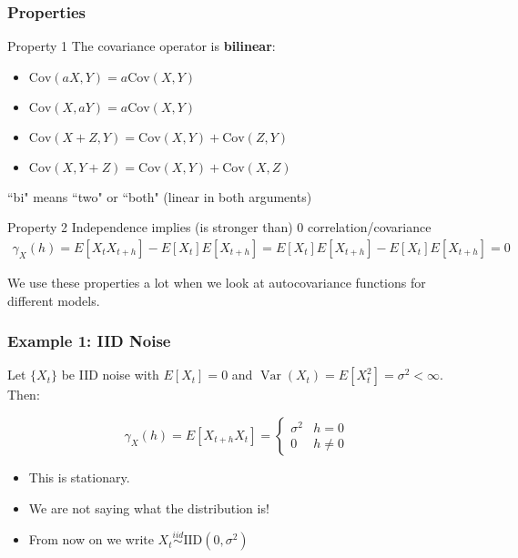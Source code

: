 \documentclass{beamer}
\begin{document}
\begin{frame}
\frametitle{Properties}

\begin{block}{Property 1}
The covariance operator is {\bf bilinear}: 
\begin{itemize}
\item $\text{Cov}(aX,Y) = a\text{Cov}(X,Y)$
\item $\text{Cov}(X,aY) = a\text{Cov}(X,Y)$
\item $\text{Cov}(X+Z,Y) = \text{Cov}(X,Y) + \text{Cov}(Z,Y)$
\item $\text{Cov}(X,Y+Z) = \text{Cov}(X,Y) + \text{Cov}(X,Z)$
\end{itemize}
\end{block}
``bi" means ``two" or ``both" (linear in both arguments)
\newline

\begin{block}{Property 2}
Independence implies (is stronger than) $0$ correlation/covariance
\begin{align*}
\gamma_X(h) = E[X_tX_{t+h}] - E[X_t]E[X_{t+h}] =  E[X_t]E[X_{t+h}] - E[X_t]E[X_{t+h}] = 0 
\end{align*}
\end{block}

We use these properties a lot when we look at autocovariance functions for different models.
\end{frame}


\begin{frame}
\frametitle{Example 1: IID Noise}

Let $\{X_t\}$ be IID noise with $E[X_t] = 0$ and $\operatorname{Var}(X_t) = E[X_t^2] = \sigma^2 < \infty$. Then:

\[ 
\gamma_X(h) = E[X_{t+h}X_t] = 
  \begin{cases} 
      \sigma^2 & h = 0 \\
      0 & h \neq 0 
   \end{cases}
\]

\begin{itemize}
\item This is stationary.
\item We are not saying what the distribution is!
\item From now on we write $X_t \overset{iid}{\sim} \text{IID}(0, \sigma^2)$
\end{itemize}

\end{frame}
\end{document}
